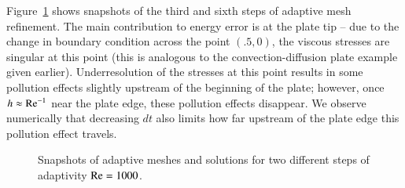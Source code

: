 Figure~\ref{fig:Re1000_midRefs} shows snapshots of the third and sixth steps of adaptive mesh refinement.  The main contribution to energy error is at the plate tip -- due to the change in boundary condition across the point $(.5,0)$, the viscous stresses are singular at this point (this is analogous to the convection-diffusion plate example given earlier).  Underresolution of the stresses at this point results in some pollution effects slightly upstream of the beginning of the plate; however, once $h\approx {\rm Re}^{-1}$ near the plate edge, these pollution effects disappear.  We observe numerically that decreasing $dt$ also limits how far upstream of the plate edge this pollution effect travels.

\begin{figure}
\centering
{}
\caption{Snapshots of adaptive meshes and solutions for two different steps of adaptivity $\Reyn = 1000$.}
\label{fig:Re1000_midRefs}
\end{figure}

